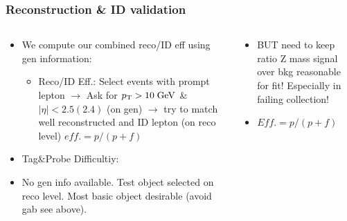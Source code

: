\documentclass{beamer}
\begin{document}
\begin{frame}
 \frametitle{Reconstruction \& ID validation}
 
   \begin{columns}
 \begin{column}{0.50\textwidth}
 
   \begin{itemize}
  \item We compute our combined reco/ID eff using gen information:
  \begin{itemize}
   \item Reco/ID Eff.: Select events with prompt lepton $\rightarrow$ Ask for $p_{\text{T}}>10\;\text{Ge}\kern-0.06667em\text{V}$ \& $|\eta|<2.5(2.4)$ (on gen) $\rightarrow$ try to match well reconstructed and ID lepton (on reco level) $eff.=p/(p+f)$
  \end{itemize}
  \item Tag\&Probe Difficultiy: 
  \item No gen info available. Test object selected on reco level. Most basic object desirable (avoid gab see above).
  \end{itemize}
 \end{column}
  \begin{column}{0.50\textwidth}
\begin{itemize}
 \item BUT need to keep ratio Z mass signal over bkg reasonable for fit! Especially in failing collection!
 \item $Eff. = p / (p + f)$  
\end{itemize}
  \end{column}
 \end{columns}
\end{frame}
\end{document}
